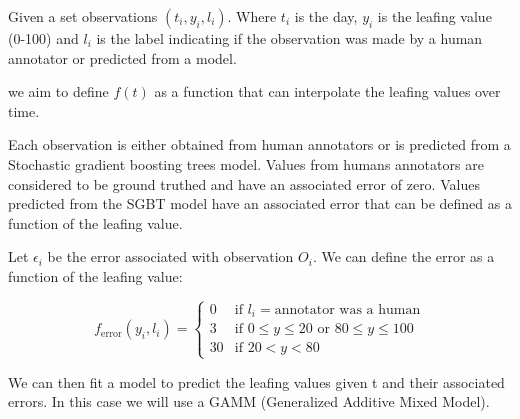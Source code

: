 \documentclass{article}
\begin{document}
Given a set observations $(t_i, y_i, l_i)$. Where $t_i$ is the day, $y_i$ is the leafing value (0-100) and $l_i$ is the label indicating if the observation was made by a human annotator or predicted from a model.

we aim to define $f(t)$ as a function that can interpolate the leafing values over time.

Each observation is either obtained from human annotators or is predicted from a Stochastic gradient boosting trees model. 
Values from humans annotators are considered to be ground truthed and have an associated error of zero.
Values predicted from the SGBT model have an associated error that can be defined as a function of the leafing value.

Let $\epsilon_i$ be the error associated with observation $O_i$. We can define the error as a function of the leafing value:

\begin{equation}
    f_{\text{error}}(y_i, l_i) = 
    \begin{cases}
        0 & \text{if } l_i = \text{annotator was a human} \\
        3 & \text{if } 0 \leq y \leq 20 \text{ or } 80 \leq y \leq 100 \\
        30 & \text{if } 20 < y < 80
    \end{cases}
\end{equation}

We can then fit a model to predict the leafing values given t and their associated errors.
In this case we will use a GAMM (Generalized Additive Mixed Model).
\end{document}

